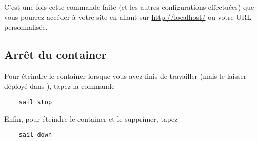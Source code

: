     C'est une fois cette commande faite (et les autres configurations effectuées) que vous pourrez accéder à votre site en allant sur \url{http://localhost/} ou votre URL personnalisée.

\subsection{Arrêt du container}

Pour éteindre le container lorsque vous avez finis de travailler (mais le laisser déployé dans \dockerdesktop), tapez la commande

\begin{lstlisting}
    sail stop
\end{lstlisting}

Enfin, pour éteindre le container et le supprimer, tapez

\begin{lstlisting}
    sail down
\end{lstlisting}
